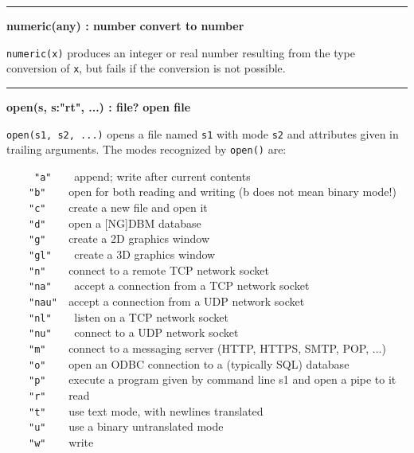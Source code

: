 \bigskip\hrule\vspace{0.1cm}
\noindent
{\bf numeric(any) : number } \hfill {\bf convert to number}

\noindent
{}\texttt{numeric(x)} produces an integer or real
number resulting from the type conversion of \texttt{x}, but fails if
the conversion is not possible.

\bigskip\hrule\vspace{0.1cm}
\noindent
{\bf open(s, s:"rt", ...) : file? } \hfill {\bf open file}

\noindent
{}\texttt{open(s1, s2, ...)} opens a file named
\texttt{s1} with mode \texttt{s2} and attributes given in trailing
arguments. The modes recognized by \texttt{open()} are: 

\ \ \ \ \ \texttt{"a"\ \ \ \ }append; write
after current contents\\
 \ \ \ \ \texttt{"b"\ \ \ \ }open for both
reading and writing (b does not mean binary mode!)\\
 \ \ \ \ \texttt{"c"\ \ \ \ }create a new
file and open it\\
 \ \ \ \ \texttt{"d"\ \ \ \ }open a
[NG]DBM database\\
 \ \ \ \ \texttt{"g"\ \ \ \ }create a 2D
graphics window\\
 \ \ \ \ \texttt{"gl"\ \ \ \ }create a 3D
graphics window\\
 \ \ \ \ \texttt{"n"\ \ \ \ }connect to a
remote TCP network socket\\
 \ \ \ \ \texttt{"na"\ \ \ \ }accept a
connection from a TCP network socket \\
 \ \ \ \ \texttt{"nau"\ \ }accept a
connection from a UDP network socket\\
 \ \ \ \ \texttt{"nl"\ \ \ \ }listen on a
TCP network socket \\
 \ \ \ \ \texttt{"nu"\ \ \ \ }connect to a
UDP network socket\\
 \ \ \ \ \texttt{"m"\ \ \ \ }connect to a
messaging server (HTTP, HTTPS, SMTP, POP, ...)\\
 \ \ \ \ \texttt{"o"\ \ \ \ }open an
ODBC connection to a (typically SQL)
database\\
 \ \ \ \ \texttt{"p"\ \ \ \ }execute a
program given by command line s1 and open a pipe to it\\
 \ \ \ \ \texttt{"r"\ \ \ \ }read\\
 \ \ \ \ \texttt{"t"\ \ \ \ }use text mode,
with newlines translated\\
 \ \ \ \ \texttt{"u"\ \ \ \ }use a binary
untranslated mode\\
 \ \ \ \ \texttt{"w"\ \ \ \ }write


